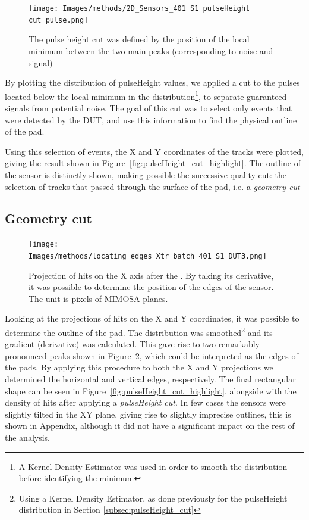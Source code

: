 \begin{figure}[!ht]
    \centering
    \texttt{[image: Images/methods/2D\_Sensors\_401 S1 pulseHeight cut\_pulse.png]}
    \caption{The pulse height cut was defined by the position of the local minimum between the two main peaks (corresponding to noise and signal)}
    \label{fig:pulseHeight_cut}
\end{figure}

By plotting the distribution of pulseHeight values, we applied a cut to the pulses located below the local minimum in the distribution\footnote{A Kernel Density Estimator was used in order to smooth the distribution before identifying the minimum}, to separate guaranteed signals from potential noise. The goal of this cut was to select only events that were detected by the DUT, and use this information to find the physical outline of the pad.

Using this selection of events, the X and Y coordinates of the tracks were plotted, giving the result shown in Figure~\ref{fig:pulseHeight_cut_highlight}. The outline of the sensor is distinctly shown, making possible the successive quality cut: the selection of tracks that passed through the surface of the pad, i.e. a \textit{geometry cut}

\subsection{Geometry cut}\label{sec:geometry_cut}

\begin{figure}[!ht]
    \centering
    \texttt{[image: Images/methods/locating\_edges\_Xtr\_batch\_401\_S1\_DUT3.png]}
    \caption{Projection of hits on the X axis after the . By taking its derivative, it was possible to determine the position of the edges of the sensor. The unit is pixels of MIMOSA planes.}
    \label{fig:edges_of_the_sensor}
\end{figure}

Looking at the projections of hits on the X and Y coordinates, it was possible to determine the outline of the pad. The distribution was smoothed\footnote{Using a Kernel Density Estimator, as done previously for the pulseHeight distribution in Section \ref{subsec:pulseHeight_cut}} and its gradient (derivative) was calculated. This gave rise to two remarkably pronounced peaks shown in Figure~\ref{fig:edges_of_the_sensor}, which could be interpreted as the edges of the pads. By applying this procedure to both the X and Y projections we determined the horizontal and vertical edges, respectively. The final rectangular shape can be seen in Figure~\ref{fig:pulseHeight_cut_highlight}, alongside with the density of hits after applying a \textit{pulseHeight cut}. In few cases the sensors were slightly tilted in the XY plane, giving rise to slightly imprecise outlines, this is  shown in Appendix, although it did not have a significant impact on the rest of the analysis.

